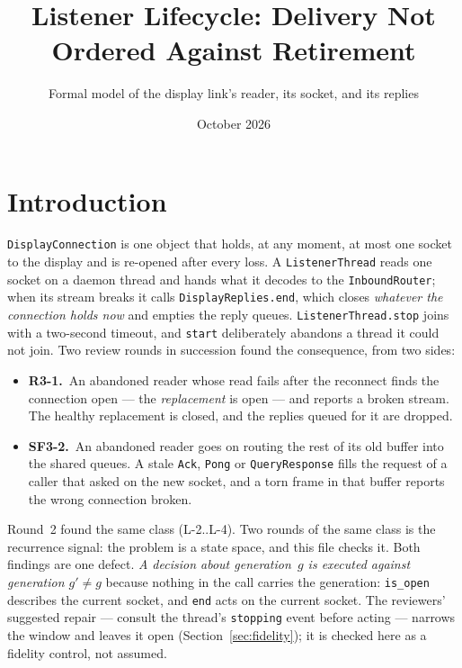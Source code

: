 \documentclass[a4paper,10pt,fleqn]{article}
\begin{document}
\title{Listener Lifecycle: Delivery Not Ordered Against Retirement}
\author{Formal model of the display link's reader, its socket, and its replies}
\date{October 2026}
\maketitle

\section{Introduction}

\texttt{DisplayConnection} is one object that holds, at any moment, at most
one socket to the display and is re-opened after every loss.  A
\texttt{ListenerThread} reads one socket on a daemon thread and hands what it
decodes to the \texttt{InboundRouter}; when its stream breaks it calls
\texttt{DisplayReplies.end}, which closes \emph{whatever the connection holds
now} and empties the reply queues.  \texttt{ListenerThread.stop} joins with a
two-second timeout, and \texttt{start} deliberately abandons a thread it could
not join.  Two review rounds in succession found the consequence, from two
sides:

\begin{itemize}
  \item \textbf{R3-1.}\ An abandoned reader whose read fails after the
    reconnect finds the connection open --- the \emph{replacement} is open ---
    and reports a broken stream.  The healthy replacement is closed, and the
    replies queued for it are dropped.
  \item \textbf{SF3-2.}\ An abandoned reader goes on routing the rest of its
    old buffer into the shared queues.  A stale \texttt{Ack},
    \texttt{Pong} or \texttt{QueryResponse} fills the request of a caller that
    asked on the new socket, and a torn frame in that buffer reports the wrong
    connection broken.
\end{itemize}

Round~2 found the same class (L-2..L-4).  Two rounds of the same class is the
recurrence signal: the problem is a state space, and this file checks it.
Both findings are one defect.  \emph{A decision about generation~$g$ is
executed against generation $g' \ne g$} because nothing in the call carries
the generation: \texttt{is\_open} describes the current socket, and
\texttt{end} acts on the current socket.  The reviewers' suggested repair ---
consult the thread's \texttt{stopping} event before acting --- narrows the
window and leaves it open (Section~\ref{sec:fidelity}); it is checked here as
a fidelity control, not assumed.
\end{document}
